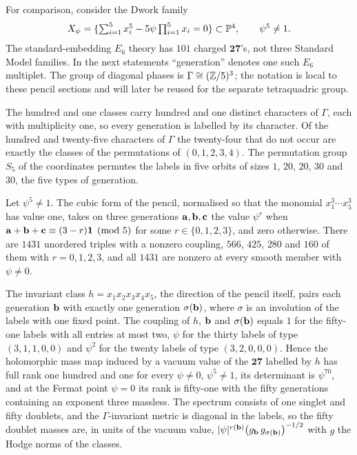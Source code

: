 For comparison, consider the Dwork family
\begin{equation}\label{eq:dwork}
 X_\psi=\{\textstyle\sum_{i=1}^5 x_i^5-5\psi\prod_{i=1}^5x_i=0\}
 \subset\mathbb{P}^4,\qquad\psi^5\ne1.
\end{equation}
The standard-embedding $E_6$ theory has $101$ charged $\mathbf{27}$'s,
not three Standard Model families. In the next statements ``generation''
denotes one such $E_6$ multiplet. The group of diagonal phases is
$\Gamma\cong(\mathbb{Z}/5)^3$; the notation is local to these pencil sections
and will later be reused for the separate tetraquadric group.


\begin{theorem}[Labels]\label{thm:A}
The hundred and one classes carry hundred and one distinct characters of
$\Gamma$, each with multiplicity one, so every generation is labelled by
its character. Of the hundred and twenty-five characters of $\Gamma$ the
twenty-four that do not occur are exactly the classes of the permutations
of $(0,1,2,3,4)$. The permutation group $S_5$ of the coordinates permutes
the labels in five orbits of sizes $1$, $20$, $20$, $30$ and $30$, the five
types of generation.
\end{theorem}

\begin{theorem}[Couplings]\label{thm:B}
Let $\psi^5\ne1$. The cubic form of the pencil, normalised so that the
monomial $x_1^3\cdots x_5^3$ has value one, takes on three generations
$\mathbf{a},\mathbf{b},\mathbf{c}$ the value $\psi^{r}$ when $\mathbf{a}+\mathbf{b}+\mathbf{c}\equiv(3-r)\mathbf{1}\pmod 5$
for some $r\in\{0,1,2,3\}$, and zero otherwise. There are $1431$ unordered
triples with a nonzero coupling, $566$, $425$, $280$ and $160$ of them with
$r=0,1,2,3$, and all $1431$ are nonzero at every smooth member with
$\psi\ne0$.
\end{theorem}

\begin{theorem}\label{thm:C}
The invariant class $h=x_1x_2x_3x_4x_5$, the direction of the pencil
itself, pairs each generation $\mathbf{b}$ with exactly one generation
$\sigma(\mathbf{b})$, where $\sigma$ is an involution of the labels with one fixed
point. The coupling of $h$, $\mathbf{b}$ and $\sigma(\mathbf{b})$ equals $1$ for the
fifty-one labels with all entries at most two, $\psi$ for the thirty labels
of type $(3,1,1,0,0)$ and $\psi^2$ for the twenty labels of type
$(3,2,0,0,0)$. Hence the holomorphic mass map induced by a vacuum value of the
$\mathbf{27}$ labelled by $h$ has full rank one hundred and one for every
$\psi\ne0$, $\psi^5\ne1$, its determinant is $\psi^{70}$, and at the
Fermat point $\psi=0$ its rank is fifty-one with the fifty generations
containing an exponent three massless. The spectrum consists of one singlet
and fifty doublets, and the $\Gamma$-invariant metric is diagonal in the
labels, so the fifty doublet masses are, in units of the vacuum value,
$|\psi|^{r(\mathbf{b})}\big(g_{\mathbf{b}}\,g_{\sigma(\mathbf{b})}\big)^{-1/2}$ with $g$ the
Hodge norms of the classes.
\end{theorem}



